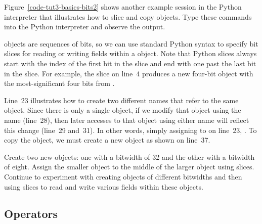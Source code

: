 \documentclass{cbxdoc}
\begin{document}
\clearpage

\begin{minipage}[t]{0.5\tw}
\setlength{\parskip}{0.5em}

  Figure~\ref{code-tut3-basics-bits2} shows another example session in
  the Python interpreter that illustrates how to slice and copy 
  objects. Type these commands into the Python interpreter and observe
  the output.

   objects are sequences of bits, so we can use standard Python
  syntax to specify bit slices for reading or writing fields within a
   object. Note that Python slices always start with the index
  of the first bit in the slice and end with one past the last bit in the
  slice. For example, the slice  on line~4 produces a new
  four-bit  object with the most-significant four bits from
  .

  Line~23 illustrates how to create two different names that refer to the
  same  object. Since there is only a single  object,
  if we modify that object using the name  (line~28), then later
  accesses to that object using either name will reflect this change
  (line~29 and~31). In other words, simply assigning  to  on
  line~23, . To copy the object, we must
  create a new  object as shown on line~37.

  \begin{task}
    Create two new  objects: one with a bitwidth of 32 and the
    other with a bitwidth of eight. Assign the smaller  object
    to the middle of the larger  object using slices. Continue
    to experiment with creating  objects of different bitwidths
    and then using slices to read and write various fields within these
     objects.
  \end{task}

\end{minipage}
\hfill
\begin{minipage}[t]{0.45\tw}
  \vspace{-0.2in}

  
\end{minipage}

\subsection{ Operators}
\label{sec-basics-bits-operators}
\end{document}

